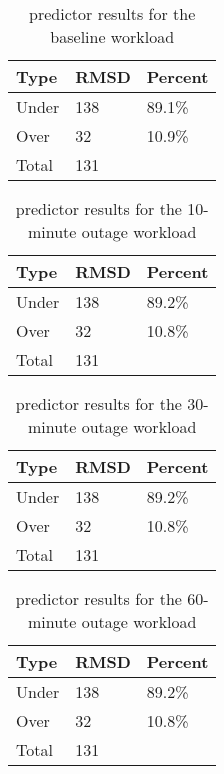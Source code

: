 \begin{table}[H]
\centering
\begin{tabular}{| l | l | l |}
\hline
Type & RMSD & Percent \\ \hline
Under & 138 & 89.1\% \\ \hline
Over & 32 & 10.9\% \\ \hline
Total & 131 & \\ \hline
\end{tabular}
\caption{predictor results for the baseline workload}
\end{table}


\begin{table}[H]
\centering
\begin{tabular}{| l | l | l |}
\hline
Type & RMSD & Percent \\ \hline
Under & 138 & 89.2\% \\ \hline
Over & 32 & 10.8\% \\ \hline
Total & 131 & \\ \hline
\end{tabular}
\caption{predictor results for the 10-minute outage workload}
\end{table}

\begin{table}[H]
\centering
\begin{tabular}{| l | l | l |}
\hline
Type & RMSD & Percent \\ \hline
Under & 138 & 89.2\% \\ \hline
Over & 32 & 10.8\% \\ \hline
Total & 131 & \\ \hline
\end{tabular}
\caption{predictor results for the 30-minute outage workload}
\end{table}

\begin{table}[H]
\centering
\begin{tabular}{| l | l | l |}
\hline
Type & RMSD & Percent \\ \hline
Under & 138 & 89.2\% \\ \hline
Over & 32 & 10.8\% \\ \hline
Total & 131 & \\ \hline
\end{tabular}
\caption{predictor results for the 60-minute outage workload}
\end{table}



